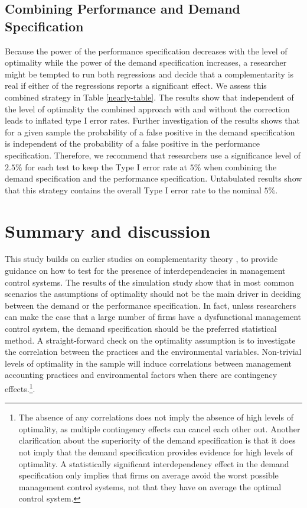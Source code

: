 \documentclass[12pt]{article}
\begin{document}
\subsection{Combining Performance and Demand Specification}

Because the power of the performance specification decreases with the level of optimality while the power of the demand specification increases, a researcher might be tempted to run both regressions and decide that a complementarity is real if either of the regressions reports a significant effect. We assess this combined strategy in Table \ref{nearly-table}. The results show that independent of the level of optimality the combined approach with and without the correction leads to inflated type I error rates. Further investigation of the results shows that for a given sample the probability of a false positive in the demand specification is independent of the probability of a false positive in the performance specification.  Therefore, we recommend that researchers use a significance level of $2.5\%$ for each test to keep the Type I error rate at $5\%$ when combining the demand specification and the performance specification. Untabulated results show that this strategy contains the overall Type I error rate to the nominal $5\%$.

\section{Summary and discussion}\label{summary-and-discussion}

This study builds on earlier studies on complementarity theory \citep{milgrom_complementarities_1995, grabner_management_2013}, to provide guidance on how to test for the presence of interdependencies in management control systems. The results of the simulation study show that in most common scenarios the assumptions of optimality should not be the main driver in deciding between the demand or the performance specification. In fact, unless researchers can make the case that a large number of firms have a dysfunctional management control system, the demand specification should be the preferred statistical method. A straight-forward check on the optimality assumption is to investigate the correlation between the practices and the environmental variables. Non-trivial levels of optimality in the sample will induce correlations between management accounting practices and environmental factors when there are contingency effects.\footnote{The absence of any correlations does not imply the absence of high levels of optimality, as multiple contingency effects can cancel each other out. Another clarification about the superiority of the demand specification is that it does not imply that the demand specification provides evidence for high levels of optimality. A statistically significant interdependency effect in the demand specification only implies that firms on average avoid the worst possible management control systems, not that they have on average the optimal control system.}.
\end{document}
